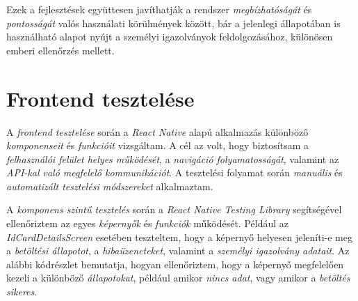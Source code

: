 \documentclass[
]{thesis-ekf}
\theoremstyle{definition}
\theoremstyle{remark}
\begin{document}
Ezek a fejlesztések együttesen javíthatják a rendszer \emph{megbízhatóságát} és \emph{pontosságát} valós használati körülmények között, bár a jelenlegi állapotában is használható alapot nyújt a személyi igazolványok feldolgozásához, különösen emberi ellenőrzés mellett.

\section{Frontend tesztelése}

A \emph{frontend tesztelése} során a \emph{React Native} alapú alkalmazás különböző \emph{komponenseit} és \emph{funkcióit} vizsgáltam. A cél az volt, hogy biztosítsam a \emph{felhasználói felület helyes működését}, a \emph{navigáció folyamatosságát}, valamint az \emph{API-kal való megfelelő kommunikációt}. A tesztelési folyamat során \emph{manuális} és \emph{automatizált tesztelési módszereket} alkalmaztam.

A \emph{komponens szintű tesztelés} során a \emph{React Native Testing Library} segítségével ellenőriztem az egyes \emph{képernyők} és \emph{funkciók} működését. Például az \emph{IdCardDetailsScreen} esetében teszteltem, hogy a képernyő helyesen jeleníti-e meg a \emph{betöltési állapotot}, a \emph{hibaüzeneteket}, valamint a \emph{személyi igazolvány adatait}. Az alábbi kódrészlet bemutatja, hogyan ellenőriztem, hogy a képernyő megfelelően kezeli a különböző \emph{állapotokat}, például amikor \emph{nincs adat}, vagy amikor a \emph{betöltés sikeres}.
\end{document}

